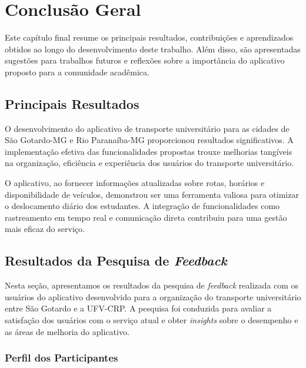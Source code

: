 \documentclass[
    12pt,                   %
    openright,              %
    oneside,                %
    a4paper,                %
    sumario=tradicional,    %
    english,                %
    brazil,                 %
    ]{abntex2}
\begin{document}
    
    
\chapter{Conclusão Geral}

\label{chap:conclusao}

Este capítulo final resume os principais resultados, contribuições e aprendizados obtidos ao longo do desenvolvimento deste trabalho. Além disso, são apresentadas sugestões para trabalhos futuros e reflexões sobre a importância do aplicativo proposto para a comunidade acadêmica.

\section{Principais Resultados}

O desenvolvimento do aplicativo de transporte universitário para as cidades de São Gotardo-MG e Rio Paranaíba-MG proporcionou resultados significativos. A implementação efetiva das funcionalidades propostas trouxe melhorias tangíveis na organização, eficiência e experiência dos usuários do transporte universitário.

O aplicativo, ao fornecer informações atualizadas sobre rotas, horários e disponibilidade de veículos, demonstrou ser uma ferramenta valiosa para otimizar o deslocamento diário dos estudantes. A integração de funcionalidades como rastreamento em tempo real e comunicação direta contribuiu para uma gestão mais eficaz do serviço.

\section{Resultados da Pesquisa de \textit{Feedback}}
\label{sec:resultados-feedback}

Nesta seção, apresentamos os resultados da pesquisa de \textit{feedback} realizada com os usuários do aplicativo desenvolvido para a organização do transporte universitário entre São Gotardo e a UFV-CRP. A pesquisa foi conduzida para avaliar a satisfação dos usuários com o serviço atual e obter \textit{insights} sobre o desempenho e as áreas de melhoria do aplicativo.

\subsection{Perfil dos Participantes}
\end{document}
